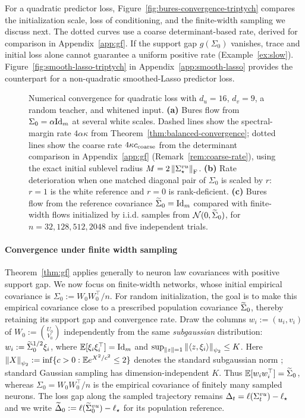 For a quadratic predictor loss, Figure~\ref{fig:bures-convergence-triptych} compares the initialization scale, loss of conditioning, and the finite-width sampling we discuss next. The dotted curves use a coarse determinant-based rate, derived for comparison in Appendix~\ref{app:gf}.
If the support gap $g(\Sigma_0)$ vanishes, trace and initial loss alone cannot guarantee a uniform positive rate (Example~\ref{ex:slow}).
Figure~\ref{fig:smooth-lasso-triptych} in Appendix~\ref{app:smooth-lasso} provides the counterpart for a non-quadratic smoothed-Lasso predictor loss.

\begin{figure}[t]
    \centering
    \resizebox{\linewidth}{!}{}
    \captionsetup{font=footnotesize,skip=2pt}
    \caption{
      Numerical convergence for quadratic loss with $d_u=16$, $d_v=9$, a random teacher, and whitened input.
      \textbf{(a)} Bures flow from $\Sigma_0=\alpha\mathrm{Id}_m$ at several white scales. Dashed lines show the spectral-margin rate $4\alpha\kappa$ from Theorem~\ref{thm:balanced-convergence}; dotted lines show the coarse rate $4\kappa c_{\rm coarse}$ from the determinant comparison in Appendix~\ref{app:gf} (Remark~\ref{rem:coarse-rate}), using the exact initial sublevel radius $M=2\left\lVert \Sigma^{vu}_\star \right\rVert_{\mathrm{F}}$.
      \textbf{(b)} Rate deterioration when one matched diagonal pair of $\Sigma_0$ is scaled by $r$: $r=1$ is the white reference and $r=0$ is rank-deficient.
      \textbf{(c)} Bures flow from the reference covariance $\widetilde\Sigma_0=\mathrm{Id}_m$ compared with finite-width flows initialized by i.i.d. samples from $\mathcal N(0,\widetilde\Sigma_0)$, for $n=32,128,512,2048$ and five independent trials.
    }
    \label{fig:bures-convergence-triptych}
    \label{fig:bures-scale-sweep}
    \label{fig:perturb-scale-sweep}
    \label{fig:bures-finite-width-comparison}
\end{figure}

\paragraph{Convergence under finite width sampling}
Theorem~\ref{thm:gf} applies generally to neuron law covariances with positive support gap.
We now focus on finite-width networks, whose initial empirical covariance is $\Sigma_0:=W_0W_0^\top/n$.
For random initialization, the goal is to make this
empirical covariance close to a prescribed population covariance
$\widetilde\Sigma_0$, thereby retaining its support gap and convergence rate.
Draw the columns $w_i:=(u_i,v_i)$ of $W_0:=\binom{U_0}{V_0}$ independently
from the same \emph{subgaussian} distribution:
$w_i:=\widetilde\Sigma_0^{1/2}\xi_i$, where $\mathbb E[\xi_i\xi_i^\top]=\mathrm{Id}_m$ and $\sup_{\left\lVert z \right\rVert=1}\left\lVert \langle z,\xi_i\rangle \right\rVert_{\psi_2}\le K$.
Here $\left\lVert X \right\rVert_{\psi_2}:=\inf\{c>0:\mathbb E e^{X^2/c^2}\le2\}$ denotes the standard subgaussian norm \citep{Vershynin2018};
standard Gaussian sampling has dimension-independent $K$.
Thus $\mathbb E[w_iw_i^\top]=\widetilde\Sigma_0$, whereas $\Sigma_0=W_0W_0^\top/n$ is the empirical covariance of finitely many sampled neurons.
The loss gap along the sampled trajectory remains $\Delta_t=\ell(\Sigma^{vu}_t)-\ell_\star$ and we write $\widetilde\Delta_0:=\ell({\widetilde{\Sigma}}^{vu}_0)-\ell_\star$ for its population reference.

